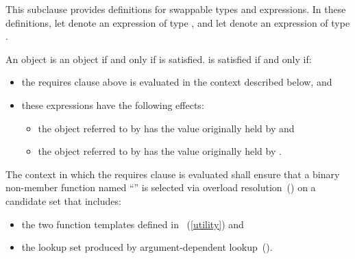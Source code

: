 \begin{addedblock}
\begin{itemdescr}
\pnum
{}


\pnum
This subclause provides definitions for swappable types and expressions. In these
definitions, let  denote an expression of type , and let 
denote an expression of type .

\pnum
An object  is  an object  if and only if
 is satisfied.  is satisfied if
and only if:

\begin{itemize}
\item the requires clause above is evaluated in the context described below, and

\item these expressions have the following effects:

\begin{itemize}
\item the object referred to by  has the value originally held by  and
\item the object referred to by  has the value originally held by .
\end{itemize}
\end{itemize}

\pnum
The context in which the requires clause is evaluated shall
ensure that a binary non-member function named ``'' is selected via overload
resolution~() on a candidate set that includes:

\begin{itemize}
\item the two  function templates defined in
~(\ref{utility}) and

\item the lookup set produced by argument-dependent lookup~().
\end{itemize}


\end{itemdescr}
\end{addedblock}
